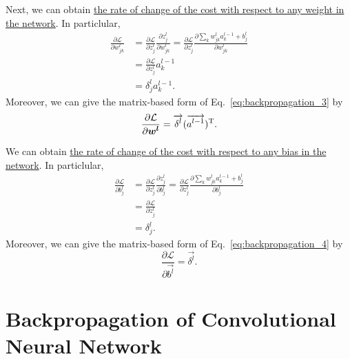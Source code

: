\documentclass[10pt,onecolumn]{book}
\newcommand{\bm}[1]{\mbox{\boldmath{$#1$}}}
\begin{document}
Next, we can obtain \uline{the rate of change of the cost with respect to any weight in the network}. In particlular, 
\begin{equation}\label{eq:backpropagation_3}
\begin{split}
\frac{\partial \mathcal{L}}{\partial w^l_{jk}} & = \frac{\partial \mathcal{L}}{\partial z^l_j} \frac{\partial z^l_j}{\partial w^l_{jk}}
	= \frac{\partial \mathcal{L}}{\partial z^l_j} \frac{\partial \sum_k w^l_{jk} a^{l-1}_k + b^l_j}{\partial w^l_{jk}} \\
	& = \frac{\partial \mathcal{L}}{\partial z^l_j} a^{l - 1}_k \\
	& = \delta^l_j a^{l - 1}_k.
\end{split}
\tag{BP3}
\end{equation}
Moreover, we can give the matrix-based form of Eq.~\ref{eq:backpropagation_3} by
\begin{equation}
\frac{\partial \mathcal{L}}{\partial \bm{w^l}} = \overrightarrow{\delta^l} (\overrightarrow{a^{l-1}})^\mathrm{T}.
\end{equation}

We can obtain \uline{the rate of change of the cost with respect to any bias in the network}. In particlular, 
\begin{equation}\label{eq:backpropagation_4}
\begin{split}
\frac{\partial \mathcal{L}}{\partial b^l_j} & = \frac{\partial \mathcal{L}}{\partial z^l_j} \frac{\partial z^l_j}{\partial b^l_j}
	= \frac{\partial \mathcal{L}}{\partial z^l_j} \frac{\partial \sum_k w^l_{jk} a^{l-1}_k + b^l_j}{\partial b^l_j} \\
	& = \frac{\partial \mathcal{L}}{\partial z^l_j} \\
	& = \delta^l_j.
\end{split}
\tag{BP4}
\end{equation}
Moreover, we can give the matrix-based form of Eq.~\ref{eq:backpropagation_4} by
\begin{equation}
\frac{\partial \mathcal{L}}{\partial \overrightarrow{b^l}} = \overrightarrow{\delta^l}.
\end{equation}

\section{Backpropagation of Convolutional Neural Network}
\end{document}
